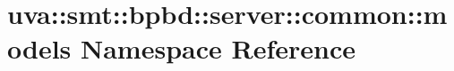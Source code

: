 \hypertarget{namespaceuva_1_1smt_1_1bpbd_1_1server_1_1common_1_1models}{}\section{uva\+:\+:smt\+:\+:bpbd\+:\+:server\+:\+:common\+:\+:models Namespace Reference}
\label{namespaceuva_1_1smt_1_1bpbd_1_1server_1_1common_1_1models}
